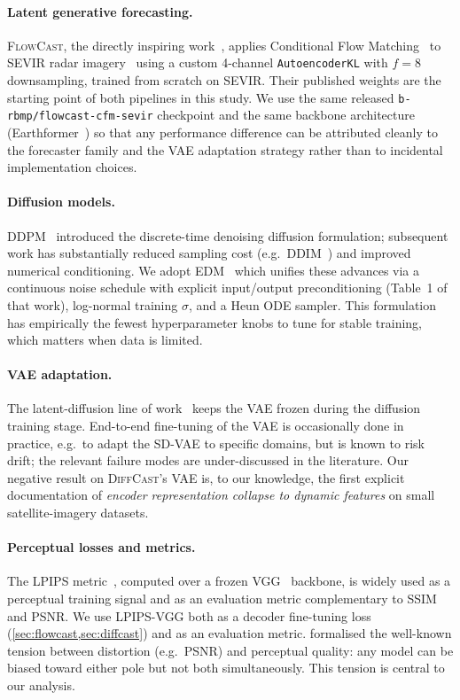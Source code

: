 \documentclass[11pt,a4paper]{article}
\begin{document}
\paragraph{Latent generative forecasting.} \textsc{FlowCast}, the directly
inspiring work~\citep{flowcast2026}, applies Conditional Flow
Matching~\citep{lipman2023flowmatching} to {SEVIR} radar
imagery~\citep{veillette2020sevir} using a custom 4-channel
\texttt{AutoencoderKL} with $f=8$ downsampling, trained from scratch on
{SEVIR}. Their published weights are the starting point of both pipelines
in this study. We use the same released
\texttt{b-rbmp/flowcast-cfm-sevir} checkpoint and the same backbone
architecture (Earthformer~\citep{gao2022earthformer}) so that any
performance difference can be attributed cleanly to the forecaster family
and the {VAE} adaptation strategy rather than to incidental implementation
choices.

\paragraph{Diffusion models.} {DDPM}~\citep{ho2020ddpm} introduced the
discrete-time denoising diffusion formulation; subsequent work has
substantially reduced sampling cost (e.g.\ {DDIM}~\citep{song2021ddim}) and
improved numerical conditioning. We adopt {EDM}~\citep{karras2022edm} which
unifies these advances via a continuous noise schedule with explicit
input/output preconditioning (Table~1 of that work), log-normal training
$\sigma$, and a Heun ODE sampler. This formulation has empirically the
fewest hyperparameter knobs to tune for stable training, which matters when
data is limited.

\paragraph{VAE adaptation.} The latent-diffusion line of
work~\citep{rombach2022ldm} keeps the {VAE} frozen during the diffusion
training stage. End-to-end fine-tuning of the {VAE} is occasionally done in
practice, e.g.\ to adapt the {SD-VAE} to specific domains, but is known to
risk drift; the relevant failure modes are under-discussed in the
literature. Our negative result on \textsc{DiffCast}'s {VAE} is, to our
knowledge, the first explicit documentation of \emph{encoder representation
collapse to dynamic features} on small satellite-imagery datasets.

\paragraph{Perceptual losses and metrics.} The {LPIPS}
metric~\citep{zhang2018lpips}, computed over a frozen
{VGG}~\citep{simonyan2014vgg} backbone, is widely used as a perceptual
training signal and as an evaluation metric complementary to {SSIM} and
{PSNR}. We use {LPIPS-VGG} both as a decoder fine-tuning loss
(\cref{sec:flowcast,sec:diffcast}) and as an evaluation metric.
\citet{blau2018perception} formalised the well-known tension between
distortion (e.g.\ {PSNR}) and perceptual quality: any model can be biased
toward either pole but not both simultaneously. This tension is central to
our analysis.
\end{document}
